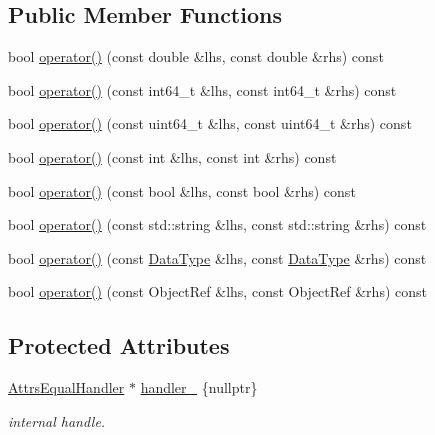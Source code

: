 \subsection*{Public Member Functions}
\begin{DoxyCompactItemize}
\item 
bool \hyperlink{classtvm_1_1AttrsEqual_af65f9cf21d8c4355388d7e54d0bdb1ef}{operator()} (const double \&lhs, const double \&rhs) const 
\item 
bool \hyperlink{classtvm_1_1AttrsEqual_a93b456b86566cac5b319db9eea0ea7f1}{operator()} (const int64\+\_\+t \&lhs, const int64\+\_\+t \&rhs) const 
\item 
bool \hyperlink{classtvm_1_1AttrsEqual_a644f5e9603108f79b65cdb4753e38b6a}{operator()} (const uint64\+\_\+t \&lhs, const uint64\+\_\+t \&rhs) const 
\item 
bool \hyperlink{classtvm_1_1AttrsEqual_a9038da9b1c4cc4216de13dc30e45a2f7}{operator()} (const int \&lhs, const int \&rhs) const 
\item 
bool \hyperlink{classtvm_1_1AttrsEqual_abf0d990a522127ceb3d0b0badd5e4dc8}{operator()} (const bool \&lhs, const bool \&rhs) const 
\item 
bool \hyperlink{classtvm_1_1AttrsEqual_a39fd9bc47e3055367f216445a679255e}{operator()} (const std\+::string \&lhs, const std\+::string \&rhs) const 
\item 
bool \hyperlink{classtvm_1_1AttrsEqual_aab0d53b8bc5dfb6b833f0a4b59266ff6}{operator()} (const \hyperlink{namespacetvm_a41918af1a1dc386388639a9d3ad06c5d}{Data\+Type} \&lhs, const \hyperlink{namespacetvm_a41918af1a1dc386388639a9d3ad06c5d}{Data\+Type} \&rhs) const 
\item 
bool \hyperlink{classtvm_1_1AttrsEqual_ac5279a5f1c09f5986c842a69899d0fa6}{operator()} (const Object\+Ref \&lhs, const Object\+Ref \&rhs) const 
\end{DoxyCompactItemize}
\subsection*{Protected Attributes}
\begin{DoxyCompactItemize}
\item 
\hyperlink{classtvm_1_1AttrsEqual_a82543680d85e663c8085c06ccc229827}{Attrs\+Equal\+Handler} $\ast$ \hyperlink{classtvm_1_1AttrsEqual_a8296ba912da1568dca506f079f0ab6c9}{handler\+\_\+} \{nullptr\}
\begin{DoxyCompactList}\small\item\em internal handle. \end{DoxyCompactList}\end{DoxyCompactItemize}
